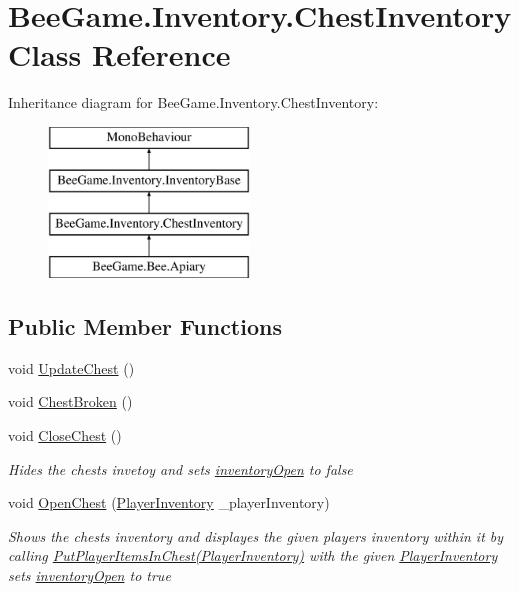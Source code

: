 \hypertarget{class_bee_game_1_1_inventory_1_1_chest_inventory}{}\section{Bee\+Game.\+Inventory.\+Chest\+Inventory Class Reference}
\label{class_bee_game_1_1_inventory_1_1_chest_inventory}
Inheritance diagram for Bee\+Game.\+Inventory.\+Chest\+Inventory\+:\begin{figure}[H]
\begin{center}
\leavevmode
\includegraphics[height=4.000000cm]{class_bee_game_1_1_inventory_1_1_chest_inventory}
\end{center}
\end{figure}
\subsection*{Public Member Functions}
\begin{DoxyCompactItemize}
\item 
void \hyperlink{class_bee_game_1_1_inventory_1_1_chest_inventory_aecb5561a169d112e46b2270d8b8548e5}{Update\+Chest} ()
\item 
void \hyperlink{class_bee_game_1_1_inventory_1_1_chest_inventory_a9d38ab66a63c4d54bbba631e267a7149}{Chest\+Broken} ()
\item 
void \hyperlink{class_bee_game_1_1_inventory_1_1_chest_inventory_a0a42c60f89a1c79ce2be4f23da86e7b6}{Close\+Chest} ()
\begin{DoxyCompactList}\small\item\em Hides the chests invetoy and sets \hyperlink{class_bee_game_1_1_inventory_1_1_chest_inventory_a3e3529178934f2a4a8e91529c148457c}{inventory\+Open} to false \end{DoxyCompactList}\item 
void \hyperlink{class_bee_game_1_1_inventory_1_1_chest_inventory_a67be88b98076c96c0dd4450093a21c20}{Open\+Chest} (\hyperlink{class_bee_game_1_1_inventory_1_1_player_inventory}{Player\+Inventory} \+\_\+player\+Inventory)
\begin{DoxyCompactList}\small\item\em Shows the chests inventory and displayes the given players inventory within it by calling \hyperlink{class_bee_game_1_1_inventory_1_1_chest_inventory_ac08125dcf875928b702044b7a7b22a01}{Put\+Player\+Items\+In\+Chest(\+Player\+Inventory)} with the given \hyperlink{class_bee_game_1_1_inventory_1_1_player_inventory}{Player\+Inventory} sets \hyperlink{class_bee_game_1_1_inventory_1_1_chest_inventory_a3e3529178934f2a4a8e91529c148457c}{inventory\+Open} to true \end{DoxyCompactList}\end{DoxyCompactItemize}
